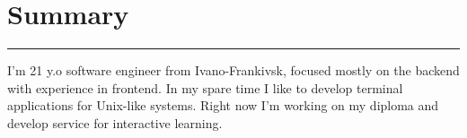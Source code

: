 {
    \section*{Summary}
    \par\noindent\rule{\textwidth}{0.1mm}

    {\vspace{0.5cm}}
    I'm 21 y.o software engineer from Ivano-Frankivsk, focused mostly on the backend with experience in frontend.
    In my spare time I like to develop terminal applications for Unix-like systems.
    Right now I'm working on my diploma and develop service for interactive learning.
}